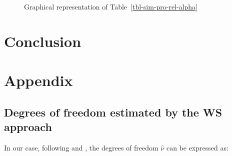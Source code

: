 \documentclass[
  12pt]{article}
\begin{document}
\begin{figure}[h]


\caption{\label{fig-sim-pro-rel-alpha}Graphical representation of
Table~\ref{tbl-sim-pro-rel-alpha}}

\end{figure}%

\section{Conclusion}\label{sec-conc}

\section{Appendix}\label{appendix}

\subsection{Degrees of freedom estimated by the WS
approach}\label{sec-df-ws}

In our case, following \citet{satterthwaite_approximate_1946} and
\citet{welch_generalization_1947}, the degrees of freedom
\(\widehat{\nu}\) can be expressed as:
\end{document}
